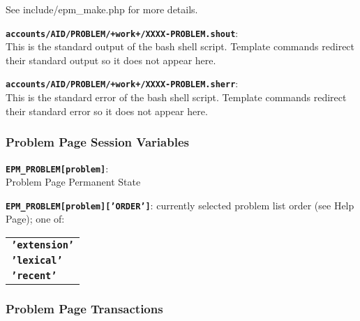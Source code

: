 \documentclass[12pt]{article}
\newenvironment{indpar}[1][0.4in]%
	{\begin{list}{}%
		     {\setlength{\itemsep}{0in}%
		      \setlength{\topsep}{0in}%
		      \setlength{\parsep}{1ex}%
		      \setlength{\labelwidth}{#1}%
		      \setlength{\leftmargin}{#1}%
		      \addtolength{\leftmargin}{\labelsep}}%
	 \item}%
	{\end{list}}
\newenvironment{itemlist}[1][0.2in]%
	{\begin{list}{}{\setlength{\labelwidth}{#1}%
		        \setlength{\leftmargin}{\labelwidth}%
		        \addtolength{\leftmargin}{+0.2in}%
		        \addtolength{\linewidth}{-\labelwidth}%
		        \addtolength{\linewidth}{-0.2in}%
		        \renewcommand{\makelabel}[1]{##1\hfill}}
	 \raggedright}%
	{\end{list}}
\newcommand{\TT}[1]{{\tt \bfseries #1}}
\begin{document}
\begin{indpar}
\begin{itemlist}
See include/epm\_make.php for more details.

\item[\TT{accounts/AID/PROBLEM/+work+/XXXX-PROBLEM.shout}:]~ \\
This is the standard output of the bash shell script.
Template commands redirect their standard output so it does not appear here.
\item[\TT{accounts/AID/PROBLEM/+work+/XXXX-PROBLEM.sherr}:]~ \\
This is the standard error of the bash shell script.
Template commands redirect their standard error so it does not appear here.
\end{itemlist}
\end{indpar}

\subsubsection{Problem Page Session Variables}

\begin{indpar}
\begin{itemlist}
\item[\TT{EPM\_PROBLEM[problem]}:] ~
\label{EPM_PROBLEM} \\
    Problem Page Permanent State
\item[\TT{EPM\_PROBLEM[problem]['ORDER']}:]
    currently selected problem list order (see Help Page); one of:
    \begin{tabular}[t]{l}
    \TT{'extension'} \\
    \TT{'lexical'} \\
    \TT{'recent'} 
    \end{tabular}
\end{itemlist}
\end{indpar}

\subsubsection{Problem Page Transactions}
\end{document}
